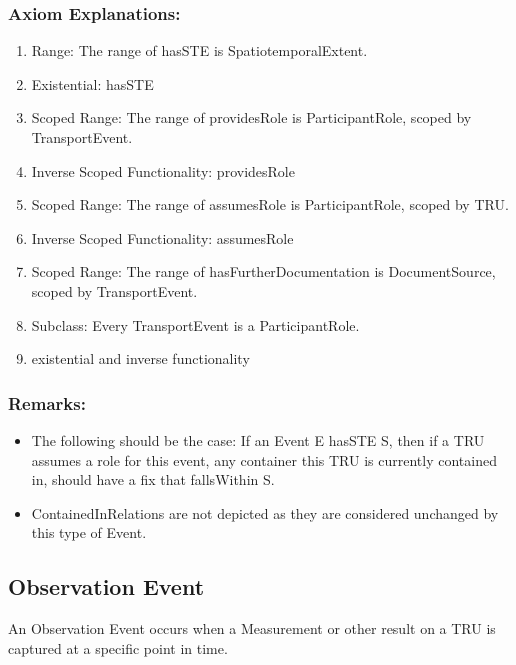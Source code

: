\subsubsection*{Axiom Explanations:}
\begin{enumerate}
    \item Range: The range of \textsf{hasSTE} is \textsf{SpatiotemporalExtent}.
    \item Existential: \textsf{hasSTE}
    \item Scoped Range: The range of \textsf{providesRole} is \textsf{ParticipantRole}, scoped by \textsf{TransportEvent}.
    \item Inverse Scoped Functionality: \textsf{providesRole}
    \item Scoped Range: The range of \textsf{assumesRole} is \textsf{ParticipantRole}, scoped by \textsf{TRU}.
    \item Inverse Scoped Functionality: \textsf{assumesRole}
    \item Scoped Range: The range of \textsf{hasFurtherDocumentation} is \textsf{DocumentSource}, scoped by \textsf{TransportEvent}.
    \item Subclass: Every \textsf{TransportEvent} is a \textsf{ParticipantRole}.
    \item existential and inverse functionality
\end{enumerate}

\subsubsection{Remarks:}
\begin{itemize}
    \item The following should be the case: If an Event E hasSTE S, then if a TRU assumes a role for this event, any container this TRU is currently contained in, should have a fix that fallsWithin S.
    \item ContainedInRelations are not depicted as they are considered unchanged by this type of Event.
\end{itemize}

\subsection{Observation Event}
\label{ssec:observation}
An Observation Event occurs when a Measurement or other result on a TRU is captured at a specific point in time. 

